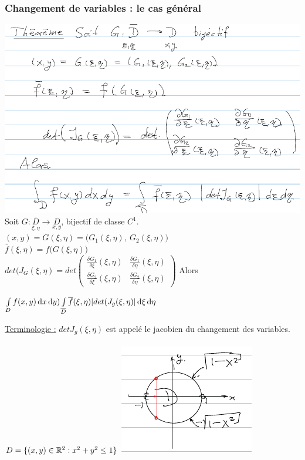 \documentclass[12pt,a4paper]{article}
\begin{document}
\subsubsection{Changement de variables : le cas général}
\begin{boite}[0.94]
	\includegraphics[scale=0.7]{images/chgt_variable}
	 Soit $G : \underset{\xi, \eta}{\overline{D}} \to \underset{x,y}{D}$, bijectif de classe $C^1$.\\
	 $(x,y) = G(\xi,\eta) =  \big(G_1(\xi, \eta),\ G_2(\xi,\eta)\big)$\\
	 $\overline{f}(\xi,\eta) = f\big(G(\xi,\eta)\big)$\\
	 $det(J_G(\xi,\eta) = det\begin{pmatrix}
	 \frac{\delta G_1}{\delta \xi}(\xi,\eta) & \frac{\delta G_1}{\delta \eta}(\xi,\eta)\\
	 \frac{\delta G_2}{\delta \xi}(\xi,\eta) & \frac{\delta G_2}{\delta \eta}(\xi,\eta)
	 \end{pmatrix}$ Alors 
	 \begin{boite}
	 	$\int\limits_D f(x,y) \, \mathrm d x\, \mathrm d y ) \int\limits_{\overline{D}} \overline{f}(\xi,\eta) |det(J_g(\xi,\eta)| \, \mathrm d \xi\, \mathrm d \eta$
	 \end{boite}
	\end{boite}
\uline{Terminologie :} $det J_g(\xi,\eta)$ est appelé le jacobien du changement des variables.\\
\\
$D = \{(x,y)  \in \mathbb{R}^2 : x^2 + y^2 \leq 1\}$ \includegraphics[scale=0.5]{images/disque_unite_polaire}
\end{document}
